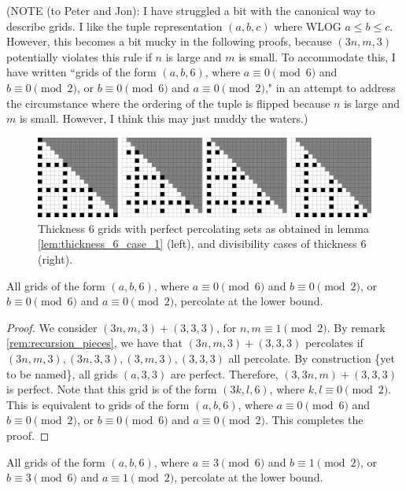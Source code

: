 (NOTE (to Peter and Jon): I have struggled a bit with the canonical way to describe grids. I like the tuple representation $(a,b,c)$ where WLOG $a \leq b \leq c$. However, this becomes a bit mucky in the following proofs, because $(3n,m,3)$ potentially violates this rule if $n$ is large and $m$ is small. To accommodate this, I have written ``grids of the form $(a,b,6)$, where $a \equiv 0 \pmod 6$ and $b \equiv 0 \pmod 2$, or $b \equiv 0 \pmod 6$ and $a \equiv 0 \pmod 2$," in an attempt to address the circumstance where the ordering of the tuple is flipped because $n$ is large and $m$ is small. However, I think this may just muddy the waters.)

\begin{figure}[]
\centering
\includegraphics[width=\textwidth]{figures/4/thickness_6_case_1.pdf}
\caption{Thickness 6 grids with perfect percolating sets as obtained in lemma \ref{lem:thickness_6_case_1} (left), and divisibility cases of thickness 6 (right).}
\label{fig:thickness_6_case_1}
\end{figure}

\begin{lem}
\label{lem:thickness_6_case_1}
All grids of the form $(a,b,6)$, where $a \equiv 0 \pmod 6$ and $b \equiv 0 \pmod 2$, or $b \equiv 0 \pmod 6$ and $a \equiv 0 \pmod 2$, percolate at the lower bound.
\end{lem}

\begin{proof}
We consider $(3n,m,3) + (3,3,3)$, for $n,m \equiv 1 \pmod 2$. By remark \ref{rem:recursion_pieces}, we have that $(3n,m,3) + (3,3,3)$ percolates if $(3n,m,3), (3n,3,3), (3,m,3),(3,3,3)$ all percolate. By construction \{yet to be named\}, all grids $(a,3,3)$ are perfect. Therefore, $(3,3n,m) + (3,3,3)$ is perfect. Note that this grid is of the form $(3k, l, 6)$, where $k,l \equiv 0 \pmod 2$. This is equivalent to grids of the form $(a,b,6)$, where $a \equiv 0 \pmod 6$ and $b \equiv 0 \pmod 2$, or $b \equiv 0 \pmod 6$ and $a \equiv 0 \pmod 2$. This completes the proof.
\end{proof}

\begin{lem}
\label{lem:thickness_6_case_2}
All grids of the form $(a,b,6)$, where $a \equiv 3 \pmod 6$ and $b \equiv 1 \pmod 2$, or $b \equiv 3 \pmod 6$ and $a \equiv 1 \pmod 2$, percolate at the lower bound.
\end{lem}

